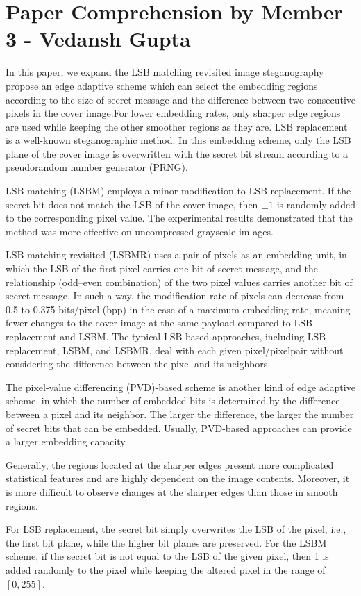 \documentclass{report}
\begin{document}
\newpage
\section{Paper Comprehension by Member 3 - Vedansh Gupta}
In this
paper, we expand the LSB matching revisited image steganography propose an edge adaptive scheme which can select the
embedding regions according to the size of secret message and the difference between two consecutive pixels in the cover image.For lower embedding rates, only sharper edge regions are used while keeping the other smoother regions as they are.
LSB replacement is a well-known steganographic method. In
this embedding scheme, only the LSB plane of the cover image
is overwritten with the secret bit stream according to a pseudorandom
number generator (PRNG). \par LSB matching (LSBM) employs a minor modification to LSB
replacement. If the secret bit does not match the LSB of the
cover image, then $\pm 1$ is randomly added to the corresponding
pixel value. The experimental results demonstrated that
the method was more effective on uncompressed grayscale im
ages. \par LSB matching revisited (LSBMR) uses a pair of pixels as an embedding unit, in which the LSB
of the first pixel carries one bit of secret message, and the relationship
(odd–even combination) of the two pixel values carries
another bit of secret message. In such a way, the modification
rate of pixels can decrease from 0.5 to 0.375 bits/pixel
(bpp) in the case of a maximum embedding rate, meaning fewer
changes to the cover image at the same payload compared to
LSB replacement and LSBM. The typical LSB-based approaches, including LSB replacement,
LSBM, and LSBMR, deal with each given pixel/pixelpair
without considering the difference between the pixel and
its neighbors. \par The pixel-value differencing (PVD)-based scheme
 is another kind of edge adaptive scheme, in
which the number of embedded bits is determined by the difference
between a pixel and its neighbor. The larger the difference,
the larger the number of secret bits that can be embedded.
Usually, PVD-based approaches can provide a larger
embedding capacity. \par Generally, the regions
located at the sharper edges present more complicated statistical
features and are highly dependent on the image contents.
Moreover, it is more difficult to observe changes at the sharper
edges than those in smooth regions. \par For LSB replacement, the secret bit
simply overwrites the LSB of the pixel, i.e., the first bit plane,
while the higher bit planes
are preserved. For the LSBM
scheme, if the secret bit is not equal to the LSB of the given
pixel, then
1 is added randomly to the pixel while keeping the
altered pixel in the range of $[0, 255]$. 
\end{document}
